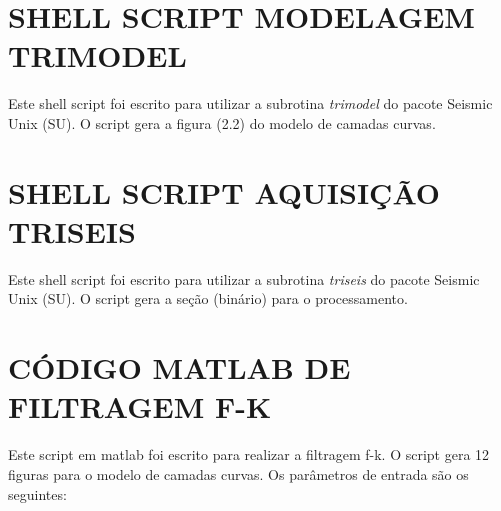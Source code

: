 \appendix
\label{apendice}

\chapter{SHELL SCRIPT MODELAGEM TRIMODEL}
\label{apendice_A}

Este shell script foi escrito para utilizar a subrotina \textit{trimodel} do pacote Seismic Unix (SU). 
O script gera a figura (2.2) do modelo de camadas curvas.



\chapter{SHELL SCRIPT AQUISIÇÃO TRISEIS}
\label{apendice_B}

Este shell script foi escrito para utilizar a subrotina \textit{triseis} do pacote Seismic Unix (SU). 
O script gera a seção (binário) para o processamento.




\chapter{CÓDIGO MATLAB DE FILTRAGEM F-K}
\label{apendice_C}
Este script em matlab foi escrito para realizar a filtragem f-k. O script gera 12 figuras para o modelo de camadas curvas.
Os parâmetros de entrada são os seguintes:



